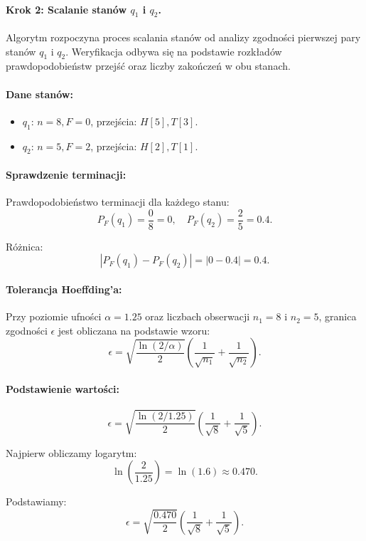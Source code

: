 \paragraph*{Krok 2: Scalanie stanów \( q_1 \) i \( q_2 \).}  
Algorytm rozpoczyna proces scalania stanów od analizy zgodności pierwszej pary stanów \( q_1 \) i \( q_2 \). Weryfikacja odbywa się na podstawie rozkładów prawdopodobieństw przejść oraz liczby zakończeń w obu stanach.  

\paragraph*{Dane stanów:}  
\begin{itemize}  
    \item \( q_1 \): \( n = 8, F = 0 \), przejścia: \( H[5], T[3] \).  
    \item \( q_2 \): \( n = 5, F = 2 \), przejścia: \( H[2], T[1] \).  
\end{itemize}  

\paragraph*{Sprawdzenie terminacji:}  
Prawdopodobieństwo terminacji dla każdego stanu:  
\[
P_F(q_1) = \frac{0}{8} = 0, \quad P_F(q_2) = \frac{2}{5} = 0.4.
\]

Różnica:  
\[
|P_F(q_1) - P_F(q_2)| = |0 - 0.4| = 0.4.
\]

\paragraph*{Tolerancja Hoeffding’a:}  
Przy poziomie ufności \( \alpha = 1.25 \) oraz liczbach obserwacji \( n_1 = 8 \) i \( n_2 = 5 \), granica zgodności \( \epsilon \) jest obliczana na podstawie wzoru:  
\[
\epsilon = \sqrt{\frac{\ln(2 / \alpha)}{2}} \left( \frac{1}{\sqrt{n_1}} + \frac{1}{\sqrt{n_2}} \right).
\]

\paragraph*{Podstawienie wartości:}  
\[
\epsilon = \sqrt{\frac{\ln(2 / 1.25)}{2}} \left( \frac{1}{\sqrt{8}} + \frac{1}{\sqrt{5}} \right).
\]

Najpierw obliczamy logarytm:  
\[
\ln\left(\frac{2}{1.25}\right) = \ln(1.6) \approx 0.470.
\]

Podstawiamy:  
\[
\epsilon = \sqrt{\frac{0.470}{2}} \left( \frac{1}{\sqrt{8}} + \frac{1}{\sqrt{5}} \right).
\]


